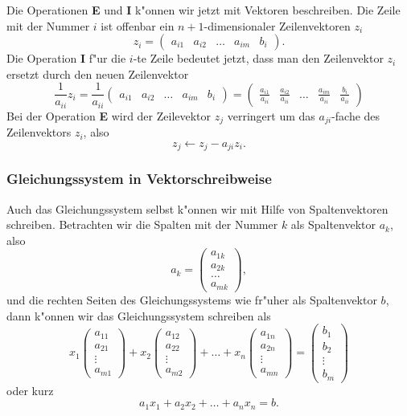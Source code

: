 Die Operationen {\bf E} und {\bf I} k"onnen wir jetzt mit Vektoren
beschreiben.
Die Zeile mit der Nummer $i$ ist offenbar ein
$n+1$-dimensionaler Zeilenvektoren $z_i$
\[
z_i=\begin{pmatrix}a_{i1}&a_{i2}&\dots&a_{im}&b_i\end{pmatrix}.
\]
Die Operation {\bf I} f"ur die $i$-te Zeile bedeutet jetzt, dass man
den Zeilenvektor $z_i$ ersetzt durch den neuen Zeilenvektor
\[
\frac1{a_{ii}}z_i
=
\frac1{a_{ii}}
\begin{pmatrix}a_{i1}&a_{i2}&\dots&a_{im}&b_i\end{pmatrix}
=
\begin{pmatrix}\frac{a_{i1}}{a_{ii}}&\frac{a_{i2}}{a_{ii}}&\dots&\frac{a_{im}}{a_{ii}}&\frac{b_i}{a_{ii}}\end{pmatrix}
\]
Bei der Operation {\bf E} wird der Zeilevektor $z_j$
verringert um das $a_{ji}$-fache des Zeilenvektors $z_i$, also
\[
z_j \leftarrow z_j-a_{ji}z_i.
\]

\subsubsection{Gleichungssystem in Vektorschreibweise}
Auch das Gleichungssystem selbst k"onnen wir mit Hilfe von Spaltenvektoren
schreiben.
Betrachten wir die Spalten mit der Nummer $k$ als Spaltenvektor $a_k$,
also
\[
a_k=\begin{pmatrix}a_{1k}\\a_{2k}\\\dots\\a_{mk}\end{pmatrix},
\]
und die rechten Seiten des Gleichungssystems wie fr"uher als Spaltenvektor $b$,
dann k"onnen wir das Gleichungssystem schreiben als
\[
x_1\begin{pmatrix}a_{11}\\a_{21}\\\vdots\\a_{m1}\end{pmatrix}
+
x_2\begin{pmatrix}a_{12}\\a_{22}\\\vdots\\a_{m2}\end{pmatrix}
+
\dots
+
x_n\begin{pmatrix}a_{1n}\\a_{2n}\\\vdots\\a_{mn}\end{pmatrix}
=
\begin{pmatrix}b_1\\b_2\\\vdots\\b_m\end{pmatrix}
\]
oder kurz
\[
a_1x_1+a_2x_2+\dots+a_nx_n=b.
\]

